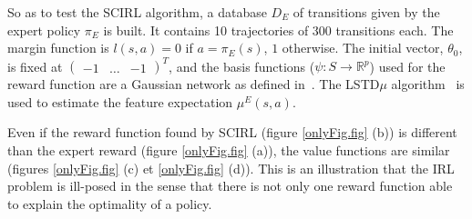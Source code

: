 \documentclass[tablecaption=bottom]{jmlr}
\begin{document}
%
%
So as to test the SCIRL algorithm, a database $D_E$ of transitions
given by the expert policy $\pi_E$ is built. It contains 10
trajectories of 300 transitions each. The margin function is $l(s,a)
= 0$ if $a=\pi_E(s)$, $1$ otherwise.
The initial vector, $\theta_0$, is fixed at $\begin{pmatrix}   -1 &
\dots & -1
\end{pmatrix}^T$,
and the basis functions ($\psi: S \rightarrow \mathbb{R}^p$) used
for the reward function are a Gaussian network as defined
in~\cite{lagoudakis2003least}. The LSTD$\mu$
algorithm~\cite{klein2011batch} is used to estimate the feature
expectation $\mu^E(s,a)$.

%
Even if the reward function found by SCIRL (figure \ref{onlyFig.fig}
(b)) is different than the expert reward (figure \ref{onlyFig.fig}
(a)), the value functions are similar (figures \ref{onlyFig.fig} (c)
et \ref{onlyFig.fig} (d)). This is an illustration that the IRL
problem is ill-posed in the sense that there is not only one reward
function able to explain the optimality of a policy.
\end{document}
